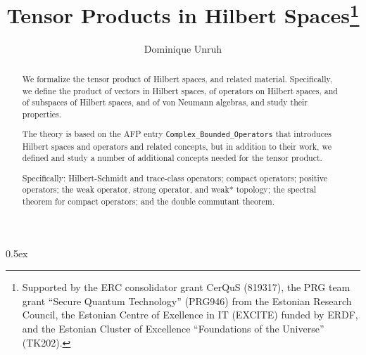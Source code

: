 \documentclass[11pt,a4paper]{article}
\begin{document}
\title{Tensor Products in Hilbert Spaces\thanks{Supported by the ERC consolidator grant CerQuS (819317), the PRG team grant “Secure Quantum Technology” (PRG946) from the Estonian Research Council, the Estonian Centre of Exellence in IT (EXCITE) funded by ERDF, and the Estonian Cluster of Excellence ``Foundations of the Universe'' (TK202).}}
\author{Dominique Unruh}
\maketitle

\begin{abstract}
  We formalize the tensor product of Hilbert spaces, and related material.
  Specifically, we define the product of vectors in Hilbert spaces, of operators on Hilbert spaces, and of subspaces of Hilbert spaces, and of von Neumann algebras, and study their properties.

  The theory is based on the AFP entry \texttt{Complex\_Bounded\_Operators} that introduces Hilbert spaces and operators and related concepts, but in addition to their work, we defined and study a number of additional concepts needed for the tensor product.

  Specifically: Hilbert-Schmidt and trace-class operators; compact operators; positive operators; the weak operator, strong operator, and weak* topology; the spectral theorem for compact operators; and the double commutant theorem.
\end{abstract}

\tableofcontents

\parindent 0pt\parskip 0.5ex





\end{document}
